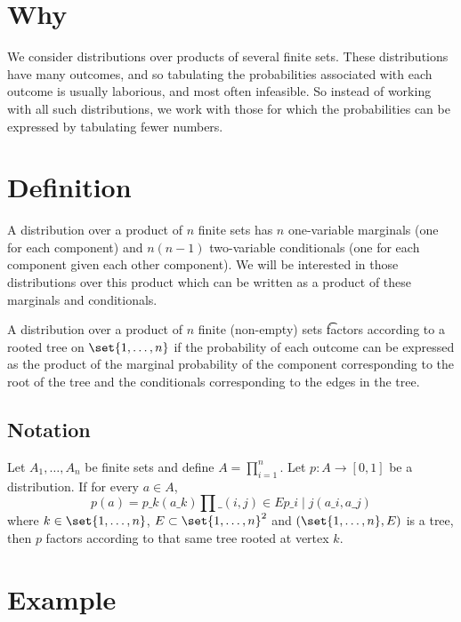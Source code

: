 

\section*{Why}

We consider distributions over products of several finite sets.
These distributions have many outcomes, and so tabulating the probabilities associated with each outcome is usually laborious, and most often infeasible.
So instead of working with all such distributions, we work with those for which the probabilities can be expressed by tabulating fewer numbers.

\section*{Definition}

A distribution over a product of $n$ finite sets has $n$ one-variable marginals (one for each component) and $n(n-1)$ two-variable conditionals (one for each component given each other component).
We will be interested in those distributions over this product which can be written as a product of these marginals and conditionals.

A distribution over a product of $n$ finite (non-empty) sets \t{factors according to a rooted tree} on $\set{1, \dots , n}$ if the probability of each outcome can be expressed as the product of the marginal probability of the component corresponding to the root of the tree and the conditionals corresponding to the edges in the tree.

\subsection*{Notation}

Let $A_1, \dots , A_n$ be finite sets and define $A = \prod_{i = 1}^{n}$.
Let $p: A \to [0, 1]$ be a distribution.
If for every $a \in A$, $$p(a) = p\_k(a\_k)\prod\_{(i, j) \in E} p\_{i \mid j}(a\_i, a\_j)$$ where $k \in \set{1, \dots , n}$, $E \subset \set{1, \dots , n}^2$ and $(\set{1, \dots , n}, E)$ is a tree, then $p$ factors according to that same tree rooted at vertex $k$.

\section*{Example}

